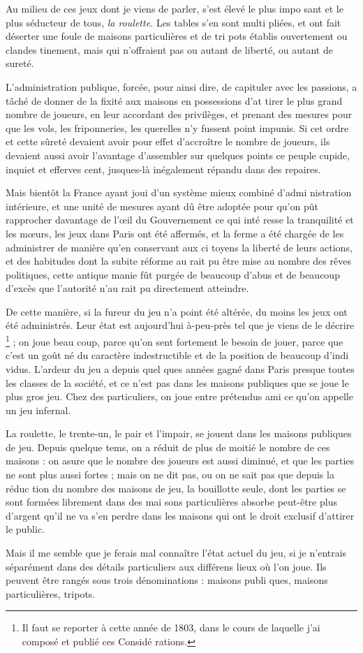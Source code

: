 Au milieu de ces jeux dont je viens
de parler, s'est élevé le plus impo%
sant et le plus séducteur de tous, \emph{la
roulette.} Les tables s'en sont multi%
pliées, et ont fait déserter une foule
de maisons particulières et de tri%
pots établis ouvertement ou clandes%
tinement, mais qui n'offraient pas
ou autant de liberté, ou autant de
sureté.

L'administration publique, forcée,
pour ainsi dire, de capituler avec les
passions, a tâché de donner de la
fixité aux maisons en possessions d'at%
tirer le plus grand nombre de joueurs,
en leur accordant des privilèges, et
prenant des mesures pour que les
vols, les friponneries, les querelles n'y
fussent point impunis. Si cet ordre et
cette sûreté devaient avoir pour effet
d'accroître le nombre de joueurs,
ils devaient aussi avoir l'avantage
d'assembler sur quelques points ce
peuple cupide, inquiet et efferves%
cent, jusques-là inégalement répandu
dans des repaires.

Mais bientôt la France ayant joui
d'un système mieux combiné d'admi%
nistration intérieure, et une unité de
mesures ayant dû être adoptée pour
qu'on pût rapprocher davantage de
l'œil du Gouvernement ce qui inté%
resse la tranquilité et les mœurs, les
jeux dans Paris ont été affermés, et la
ferme a été chargée de les administrer
de manière qu'en conservant aux ci%
toyens la liberté de leurs actions, et des
habitudes dont la subite réforme au%
rait pu être mise au nombre des rêves
politiques, cette antique manie fût
purgée de beaucoup d'abus et de 
beaucoup d'excès que l'autorité n'au%
rait pu directement atteindre.

De cette manière, si la fureur du
jeu n'a point été altérée, du moins les
jeux ont été administrés. Leur état
est aujourd'hui à-peu-près tel que je
viens de le décrire
\footnote{Il faut se reporter à cette année de 1803, dans le
  cours de laquelle j'ai composé et publié ces Considé%
rations.} ; on joue beau%
coup, parce qu'on sent fortement le
besoin de jouer, parce que c'est un
goût né du caractère indestructible
et de la position de beaucoup d'indi%
vidus. L'ardeur du jeu a depuis quel%
ques années gagné dans Paris presque
toutes les classes de la société, et ce
n'est pas dans les maisons publiques
que se joue le plus gros jeu. Chez des
particuliers, on joue entre prétendus
ami ce qu'on appelle un jeu infernal.

La roulette, le trente-un, le pair et
l'impair, se jouent dans les maisons
publiques de jeu. Depuis quelque
tems, on a réduit de plus de moitié
le nombre de ces maisons : on asure 
que le nombre des joueurs est aussi
diminué, et que les parties ne sont
plus aussi fortes ; mais on ne dit pas,
ou on ne sait pas que depuis la réduc%
tion du nombre des maisons de jeu,
la bouillotte seule, dont les parties se
sont formées librement dans des mai%
sons particulières  absorbe peut-être plus
d'argent qu'il ne va s'en perdre dans
les maisons qui ont le droit exclusif
d'attirer le public.

Mais il me semble que je ferais mal
connaître l'état actuel du jeu, si je
n'entrais séparément dans des détails
particuliers aux différens lieux où
l'on joue. Ils peuvent être rangés sous
trois dénominations : maisons publi%
ques, maisons particulières, tripots.
